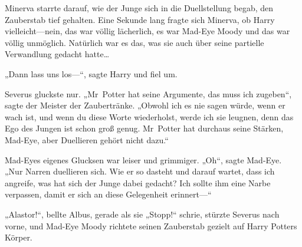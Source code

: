 \later

Minerva starrte darauf, wie der Junge sich in die Duellstellung begab, den Zauberstab tief gehalten. Eine Sekunde lang fragte sich Minerva, ob Harry vielleicht—nein, das war völlig lächerlich, es war Mad-Eye Moody und das war völlig unmöglich. Natürlich war es das, was sie auch über seine partielle Verwandlung gedacht hatte…

„Dann lass uns los—“, sagte Harry und fiel um.

Severus gluckste nur. „Mr~Potter hat seine Argumente, das muss ich zugeben“, sagte der Meister der Zaubertränke. „Obwohl ich es nie sagen würde, wenn er wach ist, und wenn du diese Worte wiederholst, werde ich sie leugnen, denn das Ego des Jungen ist schon groß genug. Mr~Potter hat durchaus seine Stärken, Mad-Eye, aber Duellieren gehört nicht dazu.“

Mad-Eyes eigenes Glucksen war leiser und grimmiger. „Oh“, sagte Mad-Eye. „Nur Narren duellieren sich. Wie er so dasteht und darauf wartet, dass ich angreife, was hat sich der Junge dabei gedacht? Ich sollte ihm eine Narbe verpassen, damit er sich an diese Gelegenheit erinnert—“

„Alastor!“, bellte Albus, gerade als sie „Stopp!“ schrie, stürzte Severus nach vorne, und Mad-Eye Moody richtete seinen Zauberstab gezielt auf Harry Potters Körper.


